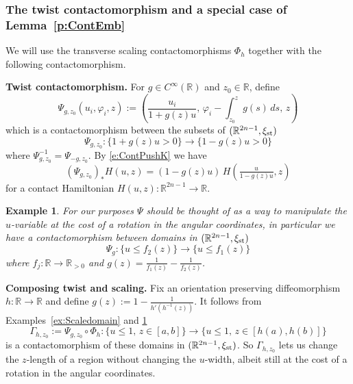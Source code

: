 \documentclass[12pt]{paper}
\theoremstyle{plain}
\newtheorem{ex}[theorem]{Example}
\theoremstyle{definition}
\newcommand{\R}{{\mathbb{R}}}
\newcommand{\st}{{\rm st}}
\numberwithin{figure}{section}
\begin{document}
\subsubsection{The twist contactomorphism and a special case of Lemma~\ref{p:ContEmb}}

We will use the transverse scaling contactomorphisms $\Phi_h$ together with the following contactomorphism.

\textbf{Twist contactomorphism.}
	For $g \in C^\infty(\R)$ and $z_0 \in \R$,
	define
	$$
		\Psi_{g,z_0}(u_i, \varphi_i, z) := \left(\frac{u_i}{1+g(z)u},\,\varphi_i - \int_{z_0}^z g(s)\,ds,\, z \right)
	$$
	which is a contactomorphism between the subsets of $(\R^{2n-1}, \xi_\st)$
	$$
		\Psi_{g, z_0}: \{1+g(z)u > 0\} \to \{1-g(z)u > 0\}
	$$
	where $\Psi_{g, z_0}^{-1} = \Psi_{-g, z_0}$.
	By \eqref{e:ContPushK} we have
	\begin{equation}\label{e:PushT}
		(\Psi_{g, z_0})_{*}H(u,z) = (1-g(z)u)\, H(\tfrac{u}{1-g(z)u}, z)
	\end{equation}
	for a contact Hamiltonian $H(u,z) : \R^{2n-1} \to \R$.
	
\begin{ex}\label{ex:domain}{\rm
For our purposes $\Psi$ should be thought of as a way to manipulate the $u$-variable at the cost of a rotation
in the angular coordinates, in particular we have a contactomorphism between domains in $(\R^{2n-1}, \xi_\st)$
$$
	\Psi_{g}: \{u \leq f_2(z)\} \to \{u \leq f_1(z)\}
$$	
where $f_j: \R \to \R_{>0}$ and $g(z) =  \tfrac{1}{f_1(z)} - \tfrac{1}{f_2(z)}$.}
\end{ex}

\textbf{Composing twist and scaling.}
Fix an orientation preserving diffeomorphism $h:\R \to \R$ and define $g(z) := 1 - \frac{1}{h'(h^{-1}(z))}$.
It follows from Examples~\ref{ex:Scaledomain} and \ref{ex:domain}
\begin{equation}\label{e:Gamma}
	\Gamma_{h, z_0}:= \Psi_{g,z_0} \circ \Phi_{h} : \{u \leq 1,\, z \in [a,b]\} \to \{u \leq 1,\, z \in [h(a), h(b)]\}
\end{equation}
is a contactomorphism of these domains in $(\R^{2n-1}, \xi_{\st})$.  So $\Gamma_{h,z_0}$ lets us change the $z$-length of a region 
without changing the $u$-width, albeit still at the cost of a rotation in the angular coordinates.
\end{document}

